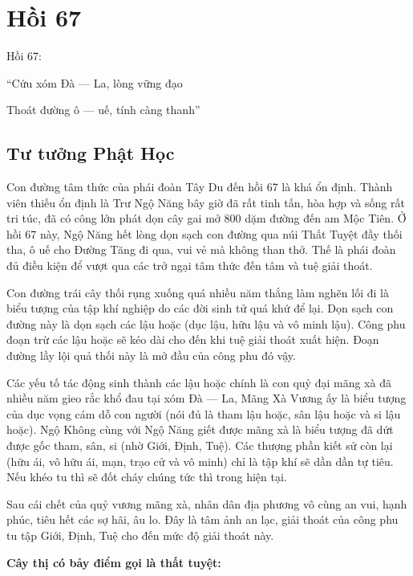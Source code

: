 \chapter{Hồi 67} %
\label{cha:hoi_67}

Hồi 67:

\begin{itshape}
``Cứu xóm Đà — La, lòng vững đạo

Thoát đường ô — uế, tính càng thanh''
\end{itshape}

\section{Tư tưởng Phật Học} %
\label{sec:67_phat_hoc}

Con đường tâm thức của phái đoàn Tây Du đến hồi 67 là khá ổn định. Thành viên thiếu ổn định là Trư Ngộ Năng bây giờ đã rất tinh tấn, hòa hợp và sống rất tri túc, đã có công lớn phát dọn cây gai mở 800 dặm đường đến am Mộc Tiên. Ở hồi 67 này, Ngộ Năng hết lòng dọn sạch con đường qua núi Thất Tuyệt đầy thối tha, ô uế cho Đường Tăng đi qua, vui vẻ mà không than thở. Thế là phái đoàn đủ điều kiện để vượt qua các trở ngại tâm thức đến tâm và tuệ giải thoát.

Con đường trái cây thối rụng xuống quá nhiều năm thắng làm nghẽn lối đi là biểu tượng của tập khí nghiệp do các đời sinh tử quá khứ để lại. Dọn sạch con đường này là dọn sạch các lậu hoặc (dục lậu, hữu lậu và vô minh lậu). Công phu đoạn trừ các lậu hoặc sẽ kéo dài cho đến khi tuệ giải thoát xuất hiện. Đoạn đường lầy lội quả thối này là mở đầu của công phu đó vậy.

Các yếu tố tác động sinh thành các lậu hoặc chính là con quỷ đại mãng xà đã nhiều năm gieo rắc khổ đau tại xóm Đà — La, Mãng Xà Vương ấy là biểu tượng của dục vọng cám dỗ con người (nói đủ là tham lậu hoặc, sân lậu hoặc và si lậu hoặc). Ngộ Không cùng với Ngộ Năng giết được mãng xà là biểu tượng đã dứt được gốc tham, sân, si (nhờ Giới, Định, Tuệ). Các thượng phần kiết sử còn lại (hữu ái, vô hữu ái, mạn, trạo cử và vô minh) chỉ là tập khí sẽ dần dần tự tiêu. Nếu khéo tu thì sẽ đốt cháy chúng tức thì trong hiện tại.

Sau cái chết của quỷ vương mãng xà, nhân dân địa phương vô cùng an vui, hạnh phúc, tiêu hết các sợ hãi, âu lo. Đây là tâm ảnh an lạc, giải thoát của công phu tu tập Giới, Định, Tuệ cho đến mức độ giải thoát này.

{\bf Cây thị có bảy điểm gọi là thất tuyệt:}

